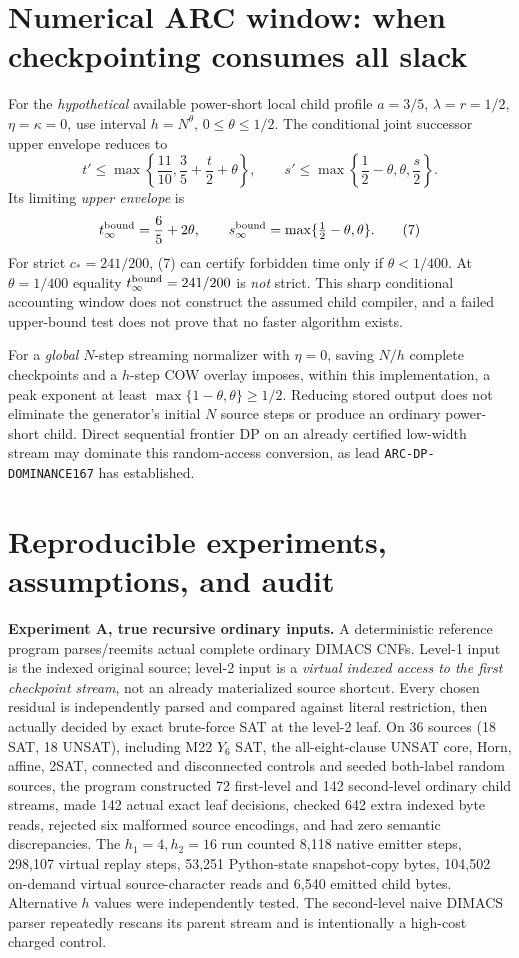\documentclass[11pt]{article}
\begin{document}
\section{Numerical ARC window: when checkpointing consumes all slack}
For the \emph{hypothetical} available power-short local child profile
$a=3/5$, $\lambda=r=1/2$, $\eta=\kappa=0$, use interval
$h=N^\theta$, $0\le\theta\le1/2$. The conditional joint successor
upper envelope reduces to
\[
t'\le \max\left\{\frac{11}{10},\frac35+\frac t2+\theta\right\},
\qquad
s'\le \max\left\{\frac12-\theta,\theta,\frac s2\right\}.
\tag{6}
\]
Its limiting \emph{upper envelope} is
\[
t_\infty^{\rm bound}=\frac65+2\theta,\qquad
s_\infty^{\rm bound}=\max\{\tfrac12-\theta,\theta\}.
\tag{7}
\]
For strict $c_*=241/200$, (7) can certify forbidden time only if
$\theta<1/400$.
At $\theta=1/400$ equality $t_\infty^{\rm bound}=241/200$ is
\emph{not} strict. This sharp conditional accounting window does not
construct the assumed child compiler, and a failed upper-bound test
does not prove that no faster algorithm exists.

For a \emph{global} $N$-step streaming normalizer with $\eta=0$, saving
$N/h$ complete checkpoints and a $h$-step COW overlay imposes, within
this implementation, a peak exponent at least
$\max\{1-\theta,\theta\}\ge1/2$.
Reducing stored output does not eliminate the generator's initial
$N$ source steps or produce an ordinary power-short child.
Direct sequential frontier DP on an already certified low-width stream
may dominate this random-access conversion, as lead
\texttt{ARC-DP-DOMINANCE167} has established.

\section{Reproducible experiments, assumptions, and audit}
\textbf{Experiment A, true recursive ordinary inputs.}
A deterministic reference program parses/reemits actual complete
ordinary DIMACS CNFs. Level-1 input is the indexed original
source; level-2 input is a \emph{virtual indexed access to the first
checkpoint stream}, not an already materialized source shortcut.
Every chosen residual is independently parsed and compared against
literal restriction, then actually decided by exact brute-force SAT
at the level-2 leaf. On 36 sources (18 SAT, 18 UNSAT), including
M22 $Y_6$ SAT, the all-eight-clause UNSAT core, Horn, affine,
2SAT, connected and disconnected controls and seeded both-label
random sources, the program constructed 72 first-level and 142
second-level ordinary child streams, made 142 actual exact leaf
decisions, checked 642 extra indexed byte reads, rejected six
malformed source encodings, and had zero semantic discrepancies.
The $h_1=4,h_2=16$ run counted 8,118 native emitter steps,
298,107 virtual replay steps, 53,251 Python-state snapshot-copy
bytes, 104,502 on-demand virtual source-character reads and 6,540
emitted child bytes. Alternative $h$ values were independently
tested. The second-level naive DIMACS parser repeatedly rescans
its parent stream and is intentionally a high-cost charged control.
\end{document}

